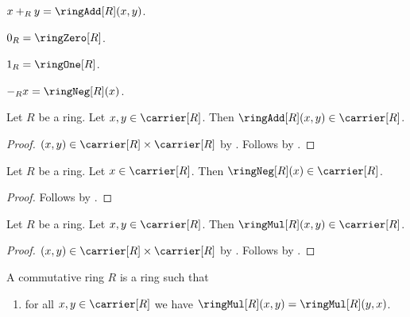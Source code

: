 \begin{abbreviation}\label{ring_add_notation}
    $x+_{R}y=\ringAdd[R](x,y)$.
\end{abbreviation}

\begin{abbreviation}\label{ring_zero_notation}
    $0_{R}=\ringZero[R]$.
\end{abbreviation}

\begin{abbreviation}\label{ring_one_notation}
    $1_{R}=\ringOne[R]$.
\end{abbreviation}

\begin{abbreviation}\label{ring_negation_notation}
    $-_{R}x=\ringNeg[R](x)$.
\end{abbreviation}

\begin{proposition}\label{ring_add_type}
    Let $R$ be a ring.
    Let $x,y\in\carrier[R]$.
    Then $\ringAdd[R](x,y)\in\carrier[R]$.
\end{proposition}
\begin{proof}
    $(x,y)\in\carrier[R]\times\carrier[R]$
        by .
    Follows by .
\end{proof}

\begin{proposition}\label{ring_neg_type}
    Let $R$ be a ring.
    Let $x\in\carrier[R]$.
    Then $\ringNeg[R](x)\in\carrier[R]$.
\end{proposition}
\begin{proof}
    Follows by .
\end{proof}

\begin{proposition}\label{ring_mul_type}
    Let $R$ be a ring.
    Let $x,y\in\carrier[R]$.
    Then $\ringMul[R](x,y)\in\carrier[R]$.
\end{proposition}
\begin{proof}
    $(x,y)\in\carrier[R]\times\carrier[R]$
        by .
    Follows by .
\end{proof}

\begin{struct}\label{commutative_ring}
    A commutative ring $R$ is a ring such that
    \begin{enumerate}
        \item\label{commutative_ring_mul_commutative}
            for all $x,y\in\carrier[R]$ we have
                $\ringMul[R](x,y)=\ringMul[R](y,x)$.
    \end{enumerate}
\end{struct}

